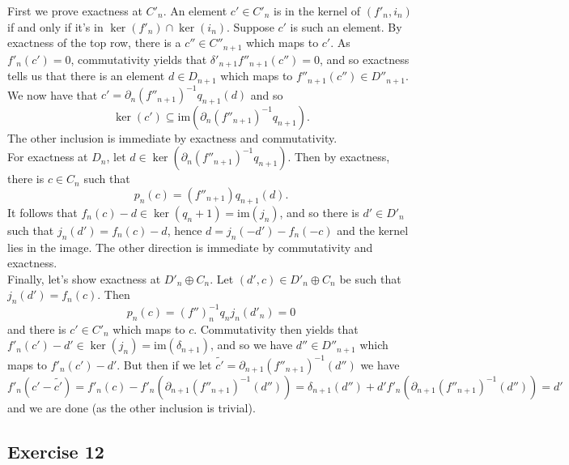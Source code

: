\documentclass{article}
\theoremstyle{definition}
\newcommand{\im}{\text{im}}
\begin{document}
First we prove exactness at $C'_n$. An element $c' \in C'_n$ is in the kernel
of $(f'_n, i_n)$ if and only if it's in $\ker(f'_n) \cap \ker(i_n)$. Suppose
$c'$ is such an element. By exactness of the top row, there is a $c'' \in
C''_{n + 1}$ which maps to $c'$. As $f'_n(c') = 0$, commutativity yields that
$\delta'_{n + 1} f''_{n + 1} (c'' ) = 0$, and so exactness tells us that there
is an element $d \in D_{n + 1}$ which maps to $f''_{n + 1}(c'') \in D''_{n +
1}$. We now have that $c' = \partial_n (f''_{n + 1})^{-1} q_{n+1}(d)$ and so 
\[
	\ker(c') \subseteq \im(\partial_n (f''_{n + 1})^{-1} q_{n+1}).
\] 
The other inclusion is immediate by exactness and commutativity. \\

For exactness at $D_n$, let $d \in \ker(\partial_n (f''_{n + 1})^{-1}
q_{n+1})$. Then by exactness, there is $c \in C_n$ such that
\[
	p_n(c) 
	=
	(f''_{n + 1})q_{n + 1}(d).
\]
It follows that $f_n(c) - d \in \ker(q_n + 1) = \im(j_{n})$, and so there is
$d' \in D'_{n}$ such that $j_{n}(d') = f_n(c) - d$, hence $d = j_n(-d') -
f_n(-c)$ and the kernel lies in the image. The other direction is immediate by
commutativity and exactness. \\

Finally, let's show exactness at $D'_n \oplus C_n$. Let $(d', c) \in D'_n
\oplus C_n$ be such that $j_n(d') = f_n(c)$. Then
\[
	p_{n}(c)
	=
	(f'')^{-1}_n q_n j_n(d'_n)
	=
	0
\]
and  there is $c' \in C'_n$ which maps to $c$. Commutativity then yields
that $f'_n(c') - d' \in \ker(j_n) = \im(\delta_{n + 1})$, and so we
have $d'' \in D''_{n + 1}$ which maps to $f'_n(c') - d'$.
But then if we let $\widetilde{c'} = \partial_{n+1}(f''_{n+1})^{-1}(d'')$
we have
\[
	f'_n(c' - \widetilde{c'}) 
	=
	f'_n(c) - f'_n(\partial_{n+1}(f''_{n+1})^{-1}(d''))
	=
	\delta_{n + 1}(d'') + d'
	f'_n(\partial_{n+1}(f''_{n+1})^{-1}(d''))
	=
	d'
\]
and we are done (as the other inclusion is trivial).


\subsection*{Exercise 12}
\end{document}
